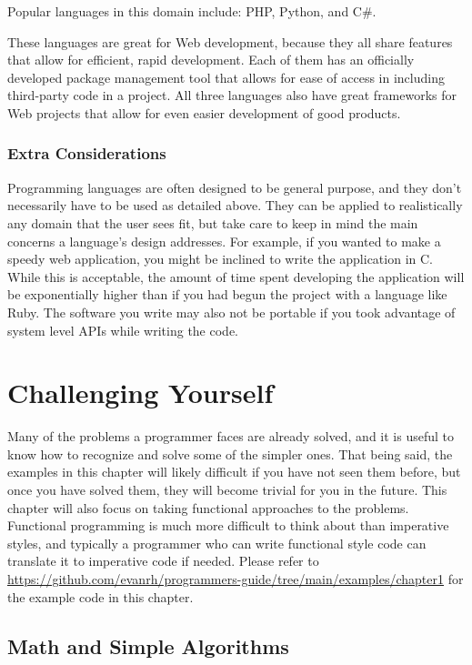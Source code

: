\documentclass[12pt, oneside, a4paper]{book}
\begin{document}
         Popular languages in this domain include: PHP, Python, and C\#.

         These languages are great for Web development, because they all share features that allow for efficient, rapid development.
         Each of them has an officially developed package management tool that allows for ease of access in including third-party code in a project.
         All three languages also have great frameworks for Web projects that allow for even easier development of good products.
         \subsection{Extra Considerations}
         Programming languages are often designed to be general purpose, and they don't necessarily have to be used as detailed above.
         They can be applied to realistically any domain that the user sees fit, but take care to keep in mind the main concerns a language's design addresses.
         For example, if you wanted to make a speedy web application, you might be inclined to write the application in C.
         While this is acceptable, the amount of time spent developing the application will be exponentially higher than if you had begun the project with a language like Ruby.
         The software you write may also not be portable if you took advantage of system level APIs while writing the code.
         
   \chapter{Challenging Yourself}
   \label{chap:challenge}
      Many of the problems a programmer faces are already solved, and it is useful to know how to recognize and solve some of the simpler ones.
      That being said, the examples in this chapter will likely difficult if you have not seen them before, but once you have solved them, they will become trivial for you in the future.
      This chapter will also focus on taking functional approaches to the problems.
      Functional programming is much more difficult to think about than imperative styles, and typically a programmer who can write functional style code can translate it to imperative code if needed.
      Please refer to \url{https://github.com/evanrh/programmers-guide/tree/main/examples/chapter1} for the example code in this chapter.

      \section{Math and Simple Algorithms}
\end{document}
